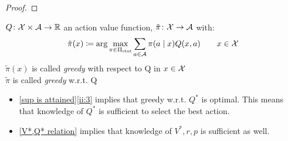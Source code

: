 \begin{proof}
\end{proof}


\begin{definition}
	\(Q\colon\mathcal{X}\times\mathcal{A}\to\mathbb{R}\) an action value function, \(\tilde{\pi}\colon\mathcal{X}\to\mathcal{A}\) with:
	\[
	\tilde{\pi}(x)\coloneqq\arg\max_{\pi\in\Pi_{\textnormal{stat}}}\sum_{a\in\mathcal{A}}\pi(a\mid x) Q(x,a)\qquad x\in\mathcal{X}
	\]
	\(\tilde{\pi}(x)\) is called \emph{greedy} with respect to Q in \(x\in\mathcal{X}\)\\
	\(\tilde{\pi}\) is called \emph{greedy} w.r.t. Q
\end{definition}


\begin{remark}\leavevmode
	\begin{itemize}
	\item \ref{sup is attained}\ref{ii:3} implies that greedy w.r.t. \(Q^*\) is optimal. 
	This means that knowledge of \(Q^*\) is sufficient to select the best action.
	\item \ref{V*,Q* relation} implies that knowledge of \(V^*,r,p\) is sufficient as well.
	\end{itemize}
\end{remark}
\endinput
